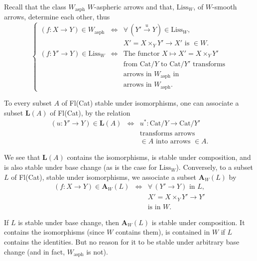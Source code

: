 \documentclass[11pt]{article}
\newcommand{\msp}[1]{\marginpar{\footnotesize [#1]}}
\begin{document}
\msp{page 66}

Recall that the class $W_{\mathrm{asph}}$ $W$-aspheric arrows and that, $\mathrm{Liss}_W$, of $W$-smooth arrows, determine each other, thus
\[
\left\{
\begin{array}{lcl}
(f : X \longrightarrow Y) \in W_{\mathrm{asph}} & \Longleftrightarrow & \forall\, (Y' \xrightarrow{\ u\ } Y) \in \mathrm{Liss}_W, \\
 & & X' = X \times_Y Y' \longrightarrow X' \text{ is } \in W. %
\\
(f : Y' \longrightarrow Y) \in \mathrm{Liss}_W & \Longleftrightarrow & \text{The functor } X \longmapsto X' = X \times_Y Y' \\
 & & \text{from } \mathrm{Cat}/Y \text{ to } \mathrm{Cat}/Y' \text{ transforms} \\
 & & \text{arrows in } W_{\mathrm{asph}} \text{ in} \\
 & & \text{arrows in } W_{\mathrm{asph}}.
\end{array}
\right.
\tag*{(4.10)}
\]

To every subset $A$ of Fl(Cat) stable under isomorphisms, one can associate a subset $\mathbf{L}(A)$ of Fl(Cat), by the relation
\[
\begin{array}{rcl}
(u : Y' \longrightarrow Y) \in \mathbf{L}(A) & \Longleftrightarrow & u^* : \mathrm{Cat}/Y \longrightarrow \mathrm{Cat}/Y' \\
 & & \text{transforms arrows} \\
 & & \in A \text{ into arrows } \in A.
\end{array}
\tag*{(4.11)}
\]

We see that $\mathbf{L}(A)$ contains the isomorphisms, is stable under composition, and is also stable under base change (as is the case for $\mathrm{Liss}_W$). Conversely, to a subset $L$ of Fl(Cat), stable under isomorphisms, we associate a subset $\mathbf{A}_W(L)$ by
\[
\begin{array}{rcl}
(f : X \longrightarrow Y) \in \mathbf{A}_W(L) & \Longleftrightarrow & \forall\, (Y' \longrightarrow Y) \text{ in } L, \\
 & & X' = X \times_Y Y' \longrightarrow Y' \\
 & & \text{is in } W.
\end{array}
\tag*{(4.12)}
\]

If $L$ is stable under base change, then $\mathbf{A}_W(L)$ is stable under composition. It contains the isomorphisms (since $W$ contains them), is contained in $W$ if $L$ contains the identities. But
\msp{page 67}
no reason for it to be stable under arbitrary base change (and in fact, $W_{\mathrm{asph}}$ is not).
\end{document}
